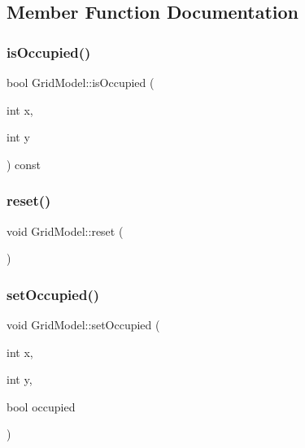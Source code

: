 \subsection{Member Function Documentation}
\mbox{\label{classGridModel_aa4f57e79f53861e038cb99f2d9c2def1}} 
\subsubsection{\texorpdfstring{is\+Occupied()}{isOccupied()}}
{\footnotesize\ttfamily bool Grid\+Model\+::is\+Occupied (\begin{DoxyParamCaption}\item[{int}]{x,  }\item[{int}]{y }\end{DoxyParamCaption}) const\hspace{0.3cm}{\ttfamily [inline]}}

\mbox{\label{classGridModel_a6258e9ff7a58b0309b5c6a19b1498c6c}} 
\subsubsection{\texorpdfstring{reset()}{reset()}}
{\footnotesize\ttfamily void Grid\+Model\+::reset (\begin{DoxyParamCaption}{ }\end{DoxyParamCaption})\hspace{0.3cm}{\ttfamily [inline]}}

\mbox{\label{classGridModel_a1e791c2a1dbe62bc9e7af59e3080637e}} 
\subsubsection{\texorpdfstring{set\+Occupied()}{setOccupied()}}
{\footnotesize\ttfamily void Grid\+Model\+::set\+Occupied (\begin{DoxyParamCaption}\item[{int}]{x,  }\item[{int}]{y,  }\item[{bool}]{occupied }\end{DoxyParamCaption})\hspace{0.3cm}{\ttfamily [inline]}}



